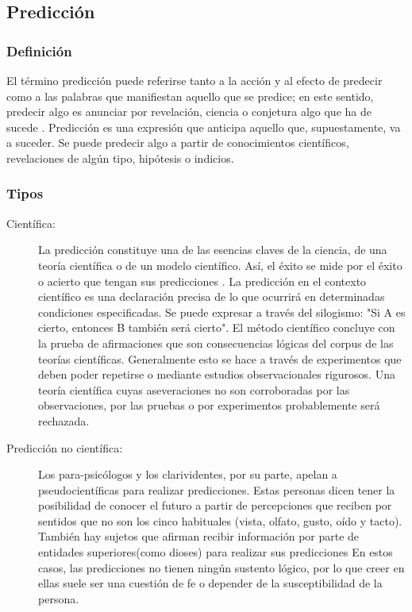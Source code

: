\subsection{Predicción}

\subsubsection{Definición}

El término predicción puede referirse tanto a la acción y al efecto de predecir como a las palabras que manifiestan aquello que se predice; en este sentido, predecir algo es anunciar por revelación, ciencia o conjetura algo que ha de sucede \citep{rae_prediccion}.
\vskip 0.2cm 
Predicción es una expresión que anticipa aquello que, supuestamente, va a suceder. Se puede predecir algo a partir de conocimientos científicos, revelaciones de algún tipo, hipótesis o indicios.

\subsubsection{Tipos}

\begin{description}
	\item [Científica:]
	\vskip 0.1cm 
	La predicción constituye una de las esencias claves de la ciencia, de una teoría científica o de un modelo científico. Así, el éxito se mide por el éxito o acierto que tengan sus predicciones \citep{mora_prediccion}.
	\vskip 0.1cm 
	La  predicción  en  el  contexto  científico  es  una  declaración  precisa  de  lo  que  ocurrirá  en determinadas  condiciones  especificadas.  Se  puede  expresar  a  través  del  silogismo:  "Si  A  es cierto, entonces B también será cierto".
	\vskip 0.1cm 
	El método científico concluye con la prueba de afirmaciones que son consecuencias lógicas del corpus de las teorías científicas. Generalmente esto se hace a través de experimentos que deben poder repetirse o mediante estudios observacionales rigurosos.
	\vskip 0.1cm 
	Una teoría científica cuyas aseveraciones no son corroboradas por las observaciones, por las pruebas o por experimentos probablemente será rechazada.
	 
	\item [Predicción no científica:]
	\vskip 0.1cm 
	Los para-psicólogos y los clarividentes, por su parte, apelan a pseudocientíficas para realizar predicciones. Estas personas dicen tener la posibilidad de conocer el futuro a partir de percepciones que reciben por sentidos que no son los cinco habituales (vista, olfato, gusto, oído y tacto). También hay sujetos que afirman recibir información por parte de entidades superiores(como dioses) para realizar sus predicciones \citep{julian_maria}
	\vskip 0.1cm 
	En estos casos, las predicciones no tienen ningún sustento lógico, por lo que creer en ellas suele ser una cuestión de fe o depender de la susceptibilidad de la persona.
	
\end{description}	
	

